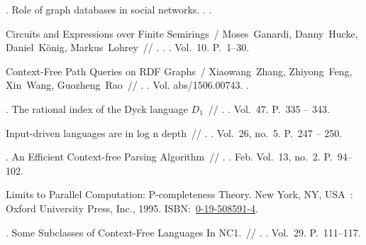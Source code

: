 \begin{thebibliography}{10}
. Role of graph databases in social
  networks. \BibDash
{}. .

Circuits and Expressions over Finite Semirings~/ Moses~Ganardi, Danny~Hucke,
  Daniel~König, Markus~Lohrey~//
  \href{http://dx.doi.org/10.1145/3241375}{}. \BibDash
{}. . \BibDash
\newblock Vol.~10. \BibDash
\newblock P.~1--30.

Context-Free Path Queries on {RDF} Graphs~/ Xiaowang~Zhang, Zhiyong~Feng,
  Xin~Wang, Guozheng~Rao~// . \BibDash
{}. \BibDash
\newblock Vol. abs/1506.00743. \BibDash
{}.

. The rational index of the Dyck
  language $D_1$~//
  \href{http://dx.doi.org/10.1016/0304-3975(86)90158-1}{}. \BibDash
{}. \BibDash
\newblock Vol.~47. \BibDash
\newblock P.~335 -- 343.

 Input-driven languages are in log n depth~//
  \href{http://dx.doi.org/10.1016/0020-0190(88)90148-2}{}. \BibDash
{}. \BibDash
\newblock Vol.~26, no.~5. \BibDash
\newblock P.~247 -- 250.

. An Efficient Context-free Parsing Algorithm~//
  \href{http://dx.doi.org/10.1145/362007.362035}{}.
  \BibDash
{}. \BibDash Feb. \BibDash
\newblock Vol.~13, no.~2. \BibDash
\newblock P.~94--102.

 Limits to Parallel
  Computation: P-completeness Theory. \BibDash
\newblock New York, NY, USA~: Oxford University Press, Inc., 1995. \BibDash
\newblock
  ISBN:~\href{http://isbndb.com/search-all.html?kw=0-19-508591-4}{0-19-508591-4}.

. Some Subclasses of
  Context-Free Languages In NC1.~//
  \href{http://dx.doi.org/10.1016/0020-0190(88)90047-6}{} \BibDash
{}. . \BibDash
\newblock Vol.~29. \BibDash
\newblock P.~111--117.


\end{thebibliography}
